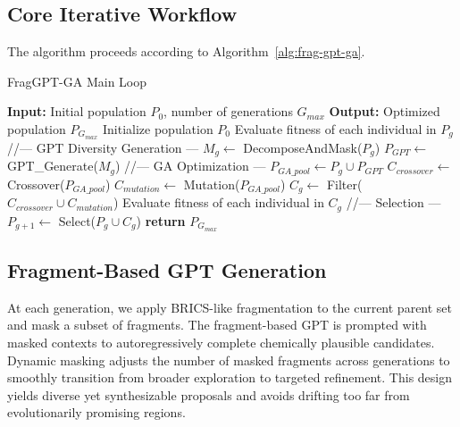 \documentclass[letterpaper,journal]{IEEEtran}
\begin{document}
\subsection{Core Iterative Workflow}
The algorithm proceeds according to Algorithm~\ref{alg:frag-gpt-ga}.
\begin{algorithm}[H]
\caption{FragGPT-GA Main Loop}
\label{alg:frag-gpt-ga}
\begin{algorithmic}
\STATE \textbf{Input:} Initial population $P_0$, number of generations $G_{max}$
\STATE \textbf{Output:} Optimized population $P_{G_{max}}$
\STATE Initialize population $P_0$
    \STATE Evaluate fitness of each individual in $P_g$
    \STATE //--- GPT Diversity Generation ---
    \STATE $M_g \leftarrow$ DecomposeAndMask($P_g$)
    \STATE $P_{GPT} \leftarrow$ GPT\_Generate($M_g$)
    \STATE //--- GA Optimization ---
    \STATE $P_{GA\_pool} \leftarrow P_g \cup P_{GPT}$
    \STATE $C_{crossover} \leftarrow$ Crossover($P_{GA\_pool}$)
    \STATE $C_{mutation} \leftarrow$ Mutation($P_{GA\_pool}$)
    \STATE $C_g \leftarrow$ Filter($C_{crossover} \cup C_{mutation}$)
    \STATE Evaluate fitness of each individual in $C_g$
    \STATE //--- Selection ---
    \STATE $P_{g+1} \leftarrow$ Select($P_g \cup C_g$)
\ENDFOR
\STATE \textbf{return} $P_{G_{max}}$
\end{algorithmic}
\end{algorithm}

\subsection{Fragment-Based GPT Generation}
At each generation, we apply BRICS-like fragmentation to the current parent set and mask a subset of fragments. The fragment-based GPT is prompted with masked contexts to autoregressively complete chemically plausible candidates. Dynamic masking adjusts the number of masked fragments across generations to smoothly transition from broader exploration to targeted refinement. This design yields diverse yet synthesizable proposals and avoids drifting too far from evolutionarily promising regions.
\end{document}
